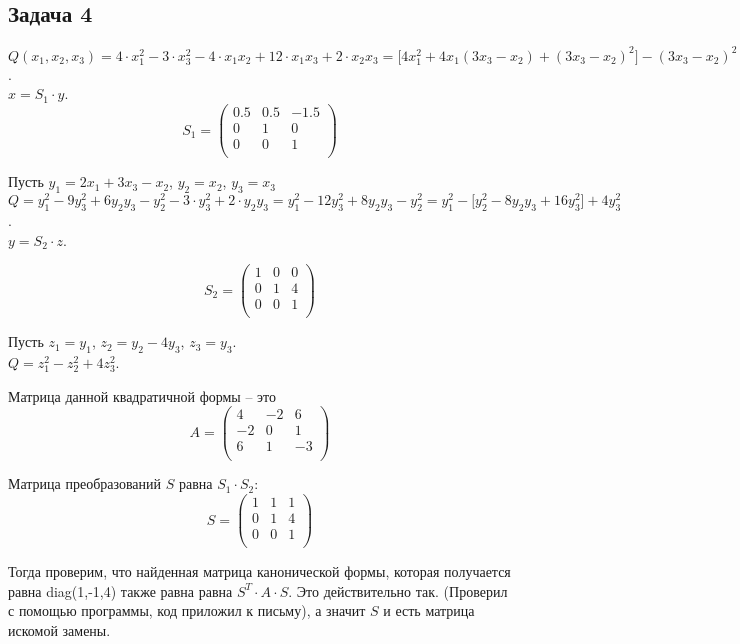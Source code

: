 	
	\subsection{Задача 4}
	
	$Q(x_1,x_2,x_3) = 4 \cdot x_1^2 - 3 \cdot x_3^2 - 4 \cdot x_1x_2 + 12 \cdot x_1x_3 + 2 \cdot x_2x_3 = \bigl[4x_1^2 +4x_1(3x_3 - x_2) + (3x_3 - x_2)^2 \bigr] - (3x_3 - x_2)^2 - 3 \cdot x_3^2 + 2 \cdot x_2x_3$. \\
	
	$x = S_1 \cdot y$.
	\[ S_1 =
	\begin{pmatrix}
	0.5 & 0.5 & -1.5  \\
	0 & 1 & 0 \\
	0 & 0 & 1 \\
	\end{pmatrix}
	\]
	
	
	
	Пусть $y_1 = 2x_1 + 3x_3 - x_2$, $y_2 = x_2$, $y_3 = x_3$ \\
	$Q = y_1^2 -9y_3^2 + 6y_2y_3 - y_2^2 - 3 \cdot y_3^2 + 2 \cdot y_2y_3 = y_1^2 -12y_3^2 + 8y_2y_3 - y_2^2 = y_1^2 -\bigl[ y_2^2 - 8y_2y_3 + 16y_3^2 \bigr] + 4y_3^2$.\\
	
	$y = S_2 \cdot z$. 
	
	\[ S_2 =
	\begin{pmatrix}
	1 & 0 & 0 \\
	0 & 1 & 4 \\
	0 & 0 & 1 \\
	\end{pmatrix}
	\]
	
	Пусть $z_1 = y_1$, $z_2 = y_2 - 4y_3$, $z_3 = y_3$. \\
	$Q = z_1^2 - z_2^2 + 4z_3^2$.
	
	Матрица данной квадратичной формы -- это	\[ A =
	\begin{pmatrix}
	4 & -2 & 6 \\
	-2 & 0 & 1 \\
	6 & 1 & -3 \\
	\end{pmatrix}
	\]
	
	Матрица преобразований $S$ равна $S_1 \cdot S_2$:
	\[ S =
	\begin{pmatrix}
	1 & 1 & 1 \\
	0 & 1 & 4 \\
	0 & 0 & 1 \\
	\end{pmatrix}
	\]
	
	Тогда проверим, что найденная матрица канонической формы, которая получается равна diag(1,-1,4) также равна равна $S^T \cdot A \cdot S$. Это действительно так. (Проверил с помощью программы, код приложил к письму), а значит $S$ и есть матрица искомой замены. 
	

	